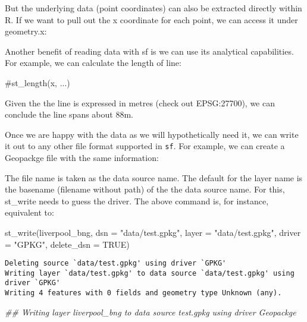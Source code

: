 \documentclass[
  letterpaper,
  DIV=11,
  numbers=noendperiod]{scrreprt}
\newenvironment{Shaded}{\begin{snugshade}}{\end{snugshade}}
\newcommand{\AttributeTok}[1]{\textcolor[rgb]{0.40,0.45,0.13}{#1}}
\newcommand{\CommentTok}[1]{\textcolor[rgb]{0.37,0.37,0.37}{#1}}
\newcommand{\ConstantTok}[1]{\textcolor[rgb]{0.56,0.35,0.01}{#1}}
\newcommand{\DocumentationTok}[1]{\textcolor[rgb]{0.37,0.37,0.37}{\textit{#1}}}
\newcommand{\FunctionTok}[1]{\textcolor[rgb]{0.28,0.35,0.67}{#1}}
\newcommand{\NormalTok}[1]{\textcolor[rgb]{0.00,0.23,0.31}{#1}}
\newcommand{\StringTok}[1]{\textcolor[rgb]{0.13,0.47,0.30}{#1}}
\begin{document}
But the underlying data (point coordinates) can also be extracted
directly within R. If we want to pull out the x coordinate for each
point, we can access it under geometry.x:

Another benefit of reading data with sf is we can use its analytical
capabilities. For example, we can calculate the length of line:

\begin{Shaded}
\begin{Highlighting}[]
\CommentTok{\#st\_length(x, ...)}
\end{Highlighting}
\end{Shaded}

Given the the line is expressed in metres (check out EPSG:27700), we can
conclude the line spans about 88m.

Once we are happy with the data as we will hypothetically need it, we
can write it out to any other file format supported in \texttt{sf}. For
example, we can create a Geopackge file with the same information:

The file name is taken as the data source name. The default for the
layer name is the basename (filename without path) of the the data
source name. For this, st\_write needs to guess the driver. The above
command is, for instance, equivalent to:

\begin{Shaded}
\begin{Highlighting}[]
\FunctionTok{st\_write}\NormalTok{(liverpool\_bng, }\AttributeTok{dsn =} \StringTok{"data/test.gpkg"}\NormalTok{, }\AttributeTok{layer =} \StringTok{"data/test.gpkg"}\NormalTok{, }\AttributeTok{driver =} \StringTok{"GPKG"}\NormalTok{, }\AttributeTok{delete\_dsn =} \ConstantTok{TRUE}\NormalTok{)}
\end{Highlighting}
\end{Shaded}

\begin{verbatim}
Deleting source `data/test.gpkg' using driver `GPKG'
Writing layer `data/test.gpkg' to data source `data/test.gpkg' using driver `GPKG'
Writing 4 features with 0 fields and geometry type Unknown (any).
\end{verbatim}

\begin{Shaded}
\begin{Highlighting}[]
\DocumentationTok{\#\# Writing layer \textasciigrave{}liverpool\_bng\textquotesingle{} to data source \textasciigrave{}test.gpkg\textquotesingle{} using driver \textasciigrave{}Geopackge\textquotesingle{}}
\end{Highlighting}
\end{Shaded}
\end{document}
